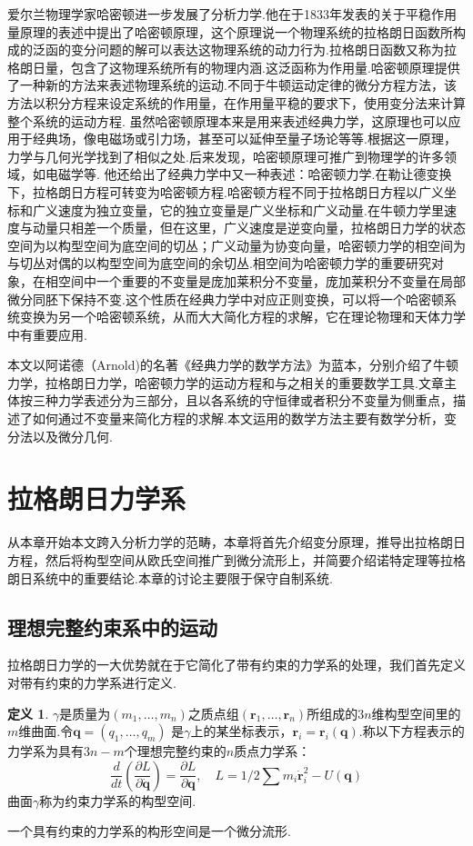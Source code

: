 \documentclass[UTF8,10.5pt,a4paper]{ctexart}
\numberwithin{equation}{section}
\theoremstyle{definition}
\theoremstyle{definition}
\newtheorem{dfn}{定义\hspace{0.05pt}}[section]
\begin{document}
\par 爱尔兰物理学家哈密顿进一步发展了分析力学.他在于1833年发表的关于平稳作用量原理的表述中提出了哈密顿原理，这个原理说一个物理系统的拉格朗日函数所构成的泛函的变分问题的解可以表达这物理系统的动力行为.拉格朗日函数又称为拉格朗日量，包含了这物理系统所有的物理内涵.这泛函称为作用量.哈密顿原理提供了一种新的方法来表述物理系统的运动.不同于牛顿运动定律的微分方程方法，该方法以积分方程来设定系统的作用量，在作用量平稳的要求下，使用变分法来计算整个系统的运动方程.
虽然哈密顿原理本来是用来表述经典力学，这原理也可以应用于经典场，像电磁场或引力场，甚至可以延伸至量子场论等等.根据这一原理，力学与几何光学找到了相似之处.后来发现，哈密顿原理可推广到物理学的许多领域，如电磁学等. 他还给出了经典力学中又一种表述：哈密顿力学.在勒让德变换下，拉格朗日方程可转变为哈密顿方程.哈密顿方程不同于拉格朗日方程以广义坐标和广义速度为独立变量，它的独立变量是广义坐标和广义动量.在牛顿力学里速度与动量只相差一个质量，但在这里，广义速度是逆变向量，拉格朗日力学的状态空间为以构型空间为底空间的切丛；广义动量为协变向量，哈密顿力学的相空间为与切丛对偶的以构型空间为底空间的余切丛.相空间为哈密顿力学的重要研究对象，在相空间中一个重要的不变量是庞加莱积分不变量，庞加莱积分不变量在局部微分同胚下保持不变.这个性质在经典力学中对应正则变换，可以将一个哈密顿系统变换为另一个哈密顿系统，从而大大简化方程的求解，它在理论物理和天体力学中有重要应用.
\par 本文以阿诺德（Arnold)的名著《经典力学的数学方法》为蓝本，分别介绍了牛顿力学，拉格朗日力学，哈密顿力学的运动方程和与之相关的重要数学工具.文章主体按三种力学表述分为三部分，且以各系统的守恒律或者积分不变量为侧重点，描述了如何通过不变量来简化方程的求解.本文运用的数学方法主要有数学分析，变分法以及微分几何.
\newpage

\section{拉格朗日力学系}
\par 从本章开始本文跨入分析力学的范畴，本章将首先介绍变分原理，推导出拉格朗日方程，然后将构型空间从欧氏空间推广到微分流形上，并简要介绍诺特定理等拉格朗日系统中的重要结论.本章的讨论主要限于保守自制系统.

\subsection{理想完整约束系中的运动}
拉格朗日力学的一大优势就在于它简化了带有约束的力学系的处理，我们首先定义对带有约束的力学系进行定义.
\begin{dfn}
$\gamma$是质量为$(m_1,\ldots,m_n)$之质点组$(\textbf{r}_1,\ldots,\textbf{r}_n)$所组成的$3n$维构型空间里的$m$维曲面.令$\textbf{q}=(q_1,\ldots,q_m)$ 是$\gamma$上的某坐标表示，$\textbf{r}_i=\textbf{r}_i(\textbf{q})$.称以下方程表示的力学系为具有$3n-m$个理想完整约束的$n$质点力学系：
$$\frac{d}{dt}(\frac{\partial L}{\partial\dot{\textbf{q}}})=\frac{\partial L}{\partial\textbf{q}},\quad L=1/2\sum m_i\dot{\textbf{r}}_i^2-U(\textbf{q})$$
曲面$\gamma$称为约束力学系的构型空间.
\end{dfn}
一个具有约束的力学系的构形空间是一个微分流形.
\end{document}
